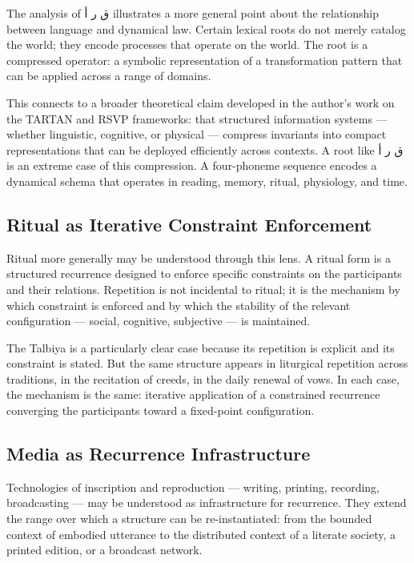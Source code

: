 \documentclass[12pt, oneside]{article}
\newcommand{\AR}[1]{\textarabic{#1}}
\theoremstyle{definition}
\theoremstyle{remark}
\begin{document}
The analysis of \AR{ق ر أ} illustrates a more general point about the relationship between language and dynamical law.
Certain lexical roots do not merely catalog the world; they encode processes that operate on the world.
The root is a compressed operator: a symbolic representation of a transformation pattern that can be applied across a range of domains.

This connects to a broader theoretical claim developed in the author's work on the TARTAN and RSVP frameworks: that structured information systems --- whether linguistic, cognitive, or physical --- compress invariants into compact representations that can be deployed efficiently across contexts.
A root like \AR{ق ر أ} is an extreme case of this compression.
A four-phoneme sequence encodes a dynamical schema that operates in reading, memory, ritual, physiology, and time.

\subsection{Ritual as Iterative Constraint Enforcement}

Ritual more generally may be understood through this lens.
A ritual form is a structured recurrence designed to enforce specific constraints on the participants and their relations.
Repetition is not incidental to ritual; it is the mechanism by which constraint is enforced and by which the stability of the relevant configuration --- social, cognitive, subjective --- is maintained.

The Talbiya is a particularly clear case because its repetition is explicit and its constraint is stated.
But the same structure appears in liturgical repetition across traditions, in the recitation of creeds, in the daily renewal of vows.
In each case, the mechanism is the same: iterative application of a constrained recurrence converging the participants toward a fixed-point configuration.

\subsection{Media as Recurrence Infrastructure}

Technologies of inscription and reproduction --- writing, printing, recording, broadcasting --- may be understood as infrastructure for recurrence.
They extend the range over which a structure can be re-instantiated: from the bounded context of embodied utterance to the distributed context of a literate society, a printed edition, or a broadcast network.
\end{document}
